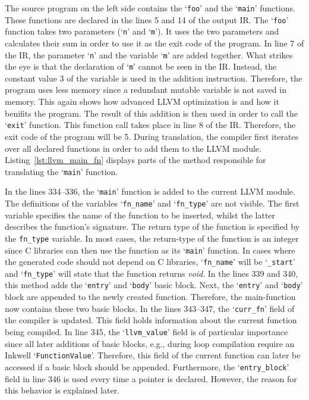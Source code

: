 The source program on the left side contains the `\texttt{foo}' and the `\texttt{main}' functions.
These functions are declared in the lines 5 and 14 of the output IR\@.
The `\texttt{foo}' function takes two parameters (`\texttt{n}' and `\texttt{m}').
It uses the two parameters and calculates their sum in order to use it as the exit code of the program.
In line 7 of the IR, the parameter `\texttt{n}' and the variable `\texttt{m}' are added together.
What strikes the eye is that the declaration of `\texttt{m}' cannot be seen in the IR\@.
Instead, the constant value 3 of the variable is used in the addition instruction.
Therefore, the program uses less memory since a redundant mutable variable is not saved in memory.
This again shows how advanced LLVM optimization is and how it benifits the program.
The result of this addition is then used in order to call the `\texttt{exit}' function.
This function call takes place in line 8 of the IR\@.
Therefore, the exit code of the program will be 5.
During translation, the compiler first iterates over all declared functions in order to add them to the LLVM module.
Listing~\ref{lst:llvm_main_fn} displays parts of the method responsible for translating the `\texttt{main}' function.


In the lines 334--336, the `\texttt{main}' function is added to the current LLVM module.
The definitions of the variables `\texttt{fn\_name}' and `\texttt{fn\_type}' are not visible.
The first variable specifies the name of the function to be inserted, whilst the latter describes the function's signature.
The return type of the function is specified by the \texttt{fn\_type} variable.
In most cases, the return-type of the function is an integer since C libraries can then use the function as its `\texttt{main}' function.
In cases where the generated code should not depend on C libraries, `\Verb|fn_name|' will be `\Verb|_start|' and `\Verb|fn_type|' will state that the function returns \emph{void}.
In the lines 339 and 340, this method adds the `\texttt{entry}' and `\texttt{body}' basic block.
Next, the `\texttt{entry}' and `\texttt{body}' block are appended to the newly created function.
Therefore, the main-function now contains these two basic blocks.
In the lines 343--347, the `\Verb|curr_fn|' field of the compiler is updated.
This field holds information about the current function being compiled.
In line 345, the `\Verb|llvm_value|' field is of particular importance since all later additions of basic blocks, e.g., during loop compilation require an Inkwell `\texttt{FunctionValue}'.
Therefore, this field of the current function can later be accessed if a basic block should be appended.
Furthermore, the `\Verb|entry_block|' field in line 346 is used every time a pointer is declared.
However, the reason for this behavior is explained later.


